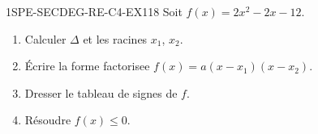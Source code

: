 


\begin{exercice}{1SPE-SECDEG-RE-C4-EX1}{1}{8}
Soit $f(x) = 2x^2 - 2x - 12$.
\begin{enumerate}
  \item Calculer $\Delta$ et les racines $x_1$, $x_2$.
  \item Écrire la forme factorisee $f(x) = a(x - x_1)(x - x_2)$.
  \item Dresser le tableau de signes de $f$.
  \item Résoudre $f(x) \leq 0$.
\end{enumerate}
\end{exercice}


